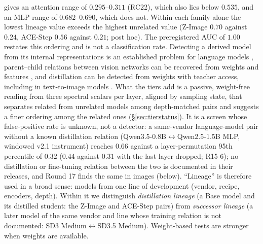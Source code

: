 \documentclass[11pt]{article}
\begin{document}
gives an attention range of $0.295$--$0.311$ (RC22), which also lies below $0.535$, and an MLP range of $0.682$--$0.690$, which does not. Within each family alone the lowest lineage value exceeds the highest unrelated value (Z-Image $0.70$ against $0.24$, ACE-Step $0.56$ against $0.21$; post hoc). The preregistered AUC of $1.00$ restates this ordering and is not a classification rate. Detecting a derived model from its internal representations is an established problem for language models \citep{zhang2024reef,zhu2025independence,tang2026representations}, parent--child relations between vision networks can be recovered from weights and features \citep{yu2024neural}, and distillation can be detected from weights with teacher access, including in text-to-image models \citep{shi2025knowledge}. What the tiers add is a passive, weight-free reading from three spectral scalars per layer, aligned by sampling state, that separates related from unrelated models among depth-matched pairs and suggests a finer ordering among the related ones (\S\ref{sec:tierstatus}). It is a screen whose false-positive rate is unknown, not a detector: a same-vendor language-model pair without a known distillation relation (Qwen3.5-0.8B$\leftrightarrow$Qwen2.5-1.5B MLP, windowed v2.1 instrument) reaches $0.66$ against a layer-permutation 95th percentile of $0.32$ ($0.44$ against $0.31$ with the last layer dropped; R15-6); no distillation or fine-tuning relation between the two is documented in their releases, and Round 17 finds the same in images (below). ``Lineage'' is therefore used in a broad sense: models from one line of development (vendor, recipe, encoders, depth). Within it we distinguish \emph{distillation lineage} (a Base model and its distilled student: the Z-Image and ACE-Step pairs) from \emph{successor lineage} (a later model of the same vendor and line whose training relation is not documented: SD3 Medium$\leftrightarrow$SD3.5 Medium). Weight-based tests are stronger when weights are available.
\end{document}
